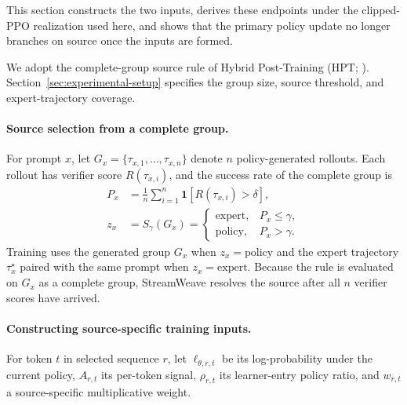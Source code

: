 \documentclass[letterpaper]{article}
\begin{document}
This section constructs the two inputs, derives these endpoints under the clipped-PPO realization used here, and shows that the primary policy update no longer branches on source once the inputs are formed.

We adopt the complete-group source rule of Hybrid Post-Training (HPT; \citealt{lv2025hpt}).
Section~\ref{sec:experimental-setup} specifies the group size, source threshold, and expert-trajectory coverage.

\paragraph{Source selection from a complete group.}
For prompt $x$, let
$G_x=\{\tau_{x,1},\ldots,\tau_{x,n}\}$
denote $n$ policy-generated rollouts.
Each rollout has verifier score $R(\tau_{x,i})$, and the success rate of the complete group is
\begin{equation}
\begin{aligned}
P_x &=
\frac{1}{n}\sum_{i=1}^{n}
\mathbf{1}\!\left[R(\tau_{x,i})>\delta\right],\\
z_x &= S_\gamma(G_x)=
\begin{cases}
\mathrm{expert}, & P_x\le\gamma,\\
\mathrm{policy}, & P_x>\gamma.
\end{cases}
\end{aligned}
\label{eq:source-selection}
\end{equation}
Training uses the generated group $G_x$ when $z_x=\mathrm{policy}$ and the expert trajectory $\tau_x^\star$ paired with the same prompt when $z_x=\mathrm{expert}$.
Because the rule is evaluated on $G_x$ as a complete group, StreamWeave resolves the source after all $n$ verifier scores have arrived.

\paragraph{Constructing source-specific training inputs.}
For token $t$ in selected sequence $r$, let $\ell_{\theta,r,t}$ be its log-probability under the current policy, $A_{r,t}$ its per-token signal, $\rho_{r,t}$ its learner-entry policy ratio, and $w_{r,t}$ a source-specific multiplicative weight.
\end{document}
